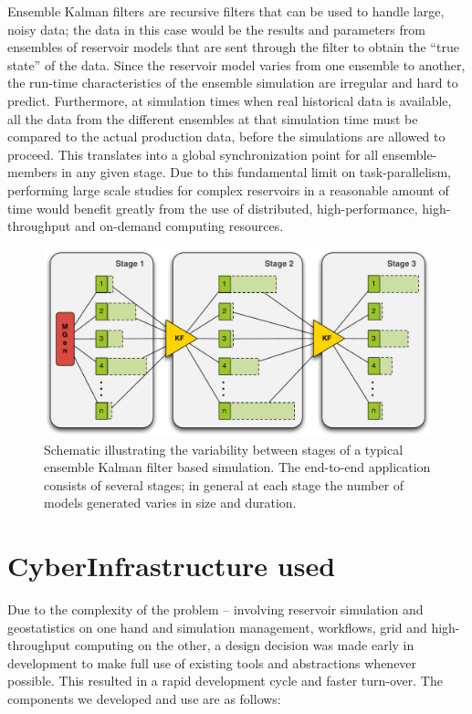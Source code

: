 \documentclass[10pt,conference,final]{IEEEtran}
\begin{document}
Ensemble Kalman filters are recursive filters that can be used to handle large, noisy data; the data in this case would be the results and parameters from ensembles of reservoir models that are sent through the filter to obtain the ``true state'' of the data. Since the reservoir model varies from one ensemble to another, the run-time characteristics of the ensemble simulation are irregular and hard to predict. Furthermore, at simulation times when real historical data is available, all the data from the different ensembles at that simulation time must be compared to the actual production data, before the simulations are allowed to proceed. This translates into a global synchronization point for all ensemble-members in any given stage. Due to this fundamental limit on task-parallelism, performing large scale studies for complex reservoirs in a reasonable amount of time would benefit greatly from the use of distributed, high-performance, high-throughput and on-demand computing resources.

\begin{figure}
\begin{center}
\includegraphics*[scale=0.33,angle=0]{figures/3StageKalmanFilter}
\end{center}
\caption{Schematic illustrating the variability between stages of a typical
  ensemble Kalman filter based simulation. The end-to-end
  application consists of several stages; in general at each stage the
  number of models generated varies in size and duration.}
\label{fig:irregular_execution}
\end{figure}

\section*{CyberInfrastructure used}

Due to the complexity of the problem -- involving reservoir simulation and geostatistics on one hand and simulation management, workflows, grid and high-throughput computing on the other, a design decision was made early in development to make full use of existing tools and abstractions whenever possible. This resulted in a rapid development cycle and faster turn-over. The components we developed and use are as follows:
\end{document}
